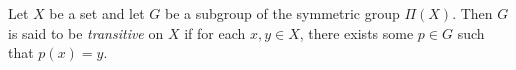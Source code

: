 Let $X$ be a set and let $G$ be a subgroup of the symmetric group $\Pi(X)$. Then $G$ is said to be \emph{transitive} on $X$ if for each $x, y \in X$, there exists some $p \in G$ such that $p(x) = y$.

